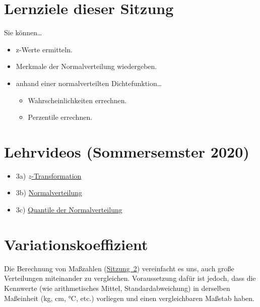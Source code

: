 \documentclass[
  11pt,
  ngerman,
  a4paper,
]{report}
\providecommand{\tightlist}{%
  \setlength{\itemsep}{0pt}\setlength{\parskip}{0pt}}
\begin{document}
\hypertarget{lernziele-dieser-sitzung-2}{%
\section*{Lernziele dieser Sitzung}\label{lernziele-dieser-sitzung-2}}

Sie können\ldots{}

\begin{itemize}
\tightlist
\item
  z-Werte ermitteln.
\item
  Merkmale der Normalverteilung wiedergeben.
\item
  anhand einer normalverteilten Dichtefunktion\ldots{}

  \begin{itemize}
  \tightlist
  \item
    Wahrscheinlichkeiten errechnen.
  \item
    Perzentile errechnen.
  \end{itemize}
\end{itemize}

\hypertarget{lehrvideos-sommersemster-2020}{%
\section*{Lehrvideos (Sommersemster 2020)}\label{lehrvideos-sommersemster-2020}}

\begin{itemize}
\tightlist
\item
  3a) \href{https://video01.uni-frankfurt.de/Mediasite/Play/8c755eed883b4ea0924481da818b742f1d}{\(z\)-Transformation}
\item
  3b) \href{https://video01.uni-frankfurt.de/Mediasite/Play/26e839cc0d8d43d2a74c2c03b76aa6421d}{Normalverteilung}
\item
  3c) \href{https://video01.uni-frankfurt.de/Mediasite/Play/902e68deb21045a79473a249303558d11d}{Quantile der Normalverteilung}
\end{itemize}

\hypertarget{variationskoeffizient}{%
\section{Variationskoeffizient}\label{variationskoeffizient}}

Die Berechnung von Maßzahlen (\protect\hyperlink{mauxdfzahlen}{Sitzung~2}) vereinfacht es uns, auch große Verteilungen miteinander zu vergleichen. Voraussetzung dafür ist jedoch, dass die Kennwerte (wie arithmetisches Mittel, Standardabweichung) in derselben Maßeinheit (kg, cm, °C, etc.) vorliegen und einen vergleichbaren Maßstab haben.
\end{document}
